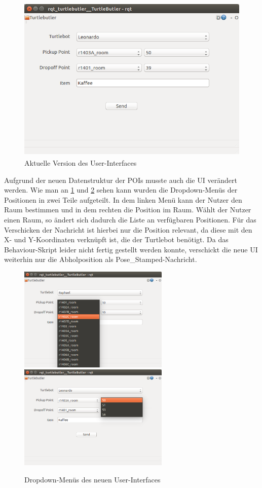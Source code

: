 \documentclass[a4paper,12pt,headsepline]{scrartcl}
\begin{document}
		\begin{figure} [H]
			\centering
			\includegraphics[height=8cm]{Images/Turtlebutler_Used.png}
			\caption{Aktuelle Version des User-Interfaces}
			\label{fig:NewUI}
		\end{figure}
		Aufgrund der neuen Datenstruktur der POIs musste auch die UI verändert werden. Wie man an \cref{fig:NewUI} und \cref{fig:NewUIDropdown} sehen kann wurden die Dropdown-Menüs der Positionen in zwei Teile aufgeteilt. In dem linken Menü kann der Nutzer den Raum bestimmen und in dem rechten die Position im Raum. Wählt der Nutzer einen Raum, so ändert sich dadurch die Liste an verfügbaren Positionen. Für das Verschicken der Nachricht ist hierbei nur die Position relevant, da diese mit den X- und Y-Koordinaten verknüpft ist, die der Turtlebot benötigt. Da das Behaviour-Skript leider nicht fertig gestellt werden konnte, verschickt die neue UI weiterhin nur die Abholposition als \glqq Pose{\_}Stamped\grqq-Nachricht.
		\begin{figure} [H]
			\centering
			\includegraphics[height=5cm]{Images/Turtlebutler_Rooms.png}
			\includegraphics[height=5cm]{Images/Turtlebutler_Positions.png}
			\caption{Dropdown-Menüs des neuen User-Interfaces}
			\label{fig:NewUIDropdown}
		\end{figure}
	
\end{document}
